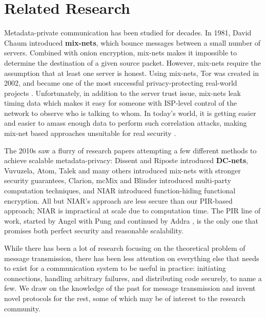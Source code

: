 \section{Related Research}

Metadata-private communication has been studied for decades. In 1981, David Chaum introduced \textbf{mix-nets}, which bounce messages between a small number of servers. Combined with onion encryption, mix-nets makes it impossible to determine the destination of a given source packet. However, mix-nets require the assumption that at least one server is honest. Using mix-nets, Tor was created in 2002, and became one of the most successful privacy-protecting real-world projects \cite{dingledine2004tor}. Unfortunately, in addition to the server trust issue, mix-nets leak timing data which makes it easy for someone with ISP-level control of the network to observe who is talking to whom. In today's world, it is getting easier and easier to amass enough data to perform such correlation attacks, making mix-net based approaches unsuitable for real security \cite{karunanayake2021anonymisation}.


The 2010s saw a flurry of research papers attempting a few different methods to achieve scalable metadata-privacy: Dissent and Riposte \cite{corrigan2010dissent,corrigan2015riposte} introduced \textbf{DC-nets}, Vuvuzela, Atom, Talek and many others \cite{van2015vuvuzela,cheng2020talek,kwon2017atom} introduced mix-nets with stronger security guarantees, Clarion, mcMix and Blinder \cite{alexopoulos2017mcmix,eskandarian2021clarion,abraham2020blinder} introduced multi-party computation techniques, and NIAR \cite{shi2021non,bunz2021non} introduced function-hiding functional encryption. All but NIAR's approach are less secure than our PIR-based approach; NIAR is impractical at scale due to computation time. The PIR line of work, started by Angel with Pung \cite{angel2016unobservable,angel2018pir} and continued by Addra \cite{ahmad2021addra}, is the only one that promises both perfect security and reasonable scalability.

While there has been a lot of research focusing on the theoretical problem of message transmission, there has been less attention on everything else that needs to exist for a communication system to be useful in practice: initiating connections, handling arbitrary failures, and distributing code securely, to name a few. We draw on the knowledge of the past for message transmission and invent novel protocols for the rest, some of which may be of interest to the research community.